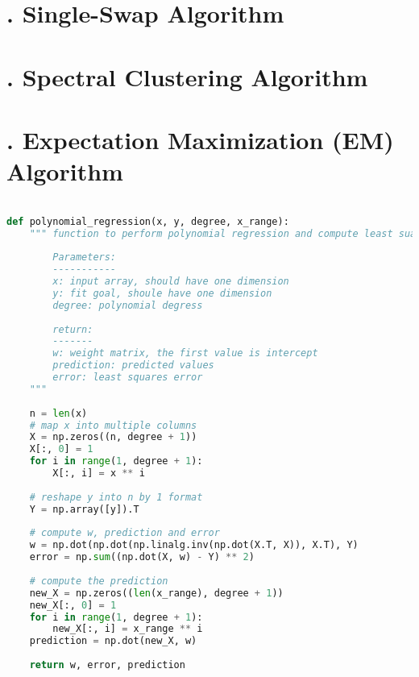 \section*{\Large {}. Single-Swap Algorithm}

\section*{\Large {}. Spectral Clustering Algorithm}

\section*{\Large {}. Expectation Maximization (EM) Algorithm}




\newpage
\begin{lstlisting}[language=Python, caption=Python example]

def polynomial_regression(x, y, degree, x_range):
    """ function to perform polynomial regression and compute least suares error
        
        Parameters:
        -----------
        x: input array, should have one dimension 
        y: fit goal, shoule have one dimension
        degree: polynomial degress
        
        return:
        -------
        w: weight matrix, the first value is intercept
        prediction: predicted values
        error: least squares error
    """
    
    n = len(x)
    # map x into multiple columns
    X = np.zeros((n, degree + 1))
    X[:, 0] = 1
    for i in range(1, degree + 1):
        X[:, i] = x ** i
    
    # reshape y into n by 1 format
    Y = np.array([y]).T
    
    # compute w, prediction and error
    w = np.dot(np.dot(np.linalg.inv(np.dot(X.T, X)), X.T), Y)
    error = np.sum((np.dot(X, w) - Y) ** 2)
    
    # compute the prediction
    new_X = np.zeros((len(x_range), degree + 1))
    new_X[:, 0] = 1
    for i in range(1, degree + 1):
        new_X[:, i] = x_range ** i
    prediction = np.dot(new_X, w)
    
    return w, error, prediction
\end{lstlisting}



\clearpage

%
%
%



